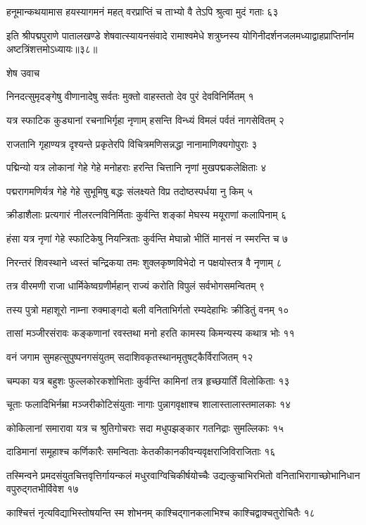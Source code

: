 हनूमान्कथयामास हयस्यागमनं महत्
वरप्राप्तिं च ताभ्यो वै तेऽपि श्रुत्वा मुदं गताः ६३

इति श्रीपद्मपुराणे पातालखण्डे शेषवात्स्यायनसंवादे रामाश्वमेधे शत्रुघ्नस्य योगिनीदर्शनजलमध्याद्वाहप्राप्तिर्नाम अष्टत्रिंशत्तमोऽध्यायः॥३८॥


शेष उवाच

निनदत्सुमृदङ्गेषु वीणानादेषु सर्वतः
मुक्तो वाहस्ततो देव पुरं देवविनिर्मितम् १

यत्र स्फाटिक कुड्यानां रचनाभिर्गृहा नृणाम्
हसन्ति विन्ध्यं विमलं पर्वतं नागसेवितम् २

राजतानि गृहाण्यत्र दृश्यन्ते प्रकृतेरपि
विचित्रमणिसन्नद्धा नानामाणिक्यगोपुराः ३

पद्मिन्यो यत्र लोकानां गेहे गेहे मनोहराः
हरन्ति चित्तानि नृणां मुखपद्मकलेक्षिताः ४

पद्मरागमणिर्यत्र गेहे गेहे सुभूमिषु
बद्धः संलक्ष्यते विप्र तदोष्ठस्पर्धया नु किम् ५

क्रीडाशैलाः प्रत्यगारं नीलरत्नविनिर्मिताः
कुर्वन्ति शङ्कां मेघस्य मयूराणां कलापिनाम् ६

हंसा यत्र नृणां गेहे स्फाटिकेषु नियन्त्रिताः
कुर्वन्ति मेघान्नो भीतिं मानसं न स्मरन्ति च ७

निरन्तरं शिवस्थाने ध्वस्तं चन्द्रिकया तमः
शुक्लकृष्णविभेदो न पक्षयोस्तत्र वै नृणाम् ८

तत्र वीरमणी राजा धार्मिकेष्वग्रणीर्महान्
राज्यं करोति विपुलं सर्वभोगसमन्वितम् ९

तस्य पुत्रो महाशूरो नाम्ना रुक्माङ्गदो बली
वनिताभिर्गतो रम्यदेहाभिः क्रीडितुं वनम् १०

तासां मञ्जीरसंरावः कङ्कणानां रवस्तथा
मनो हरति कामस्य किमन्यस्य कथात्र भोः ११

वनं जगाम सुमहत्सुपुष्पनगसंयुतम्
सदाशिवकृतस्थानमृतुषट्कैर्विराजितम् १२

चम्पका यत्र बहुशः फुल्लकोरकशोभिताः
कुर्वन्ति कामिनां तत्र हृच्छयार्तिं विलोकिताः १३

चूताः फलादिभिर्नम्रा मञ्जरीकोटिसंयुताः
नागाः पुन्नागवृक्षाश्च शालास्तालास्तमालकाः १४

कोकिलानां समारावा यत्र च श्रुतिगोचराः
सदा मधुपझङ्कार गतनिद्राः सुमल्लिकाः १५

दाडिमानां समूहाश्च कर्णिकारैः समन्विताः
केतकीकानकीवन्यवृक्षराजिविराजिताः १६

तस्मिन्वने प्रमदसंयुतचित्तवृत्तिर्गायन्कलं मधुरवाग्विचिकीर्षयोच्चैः
उद्यत्कुचाभिरभितो वनिताभिरागाच्छोभानिधान वपुरुद्गतभीर्विवेश १७

काश्चित्तं नृत्यविद्याभिस्तोषयन्ति स्म शोभनम्
काश्चिद्गानकलाभिश्च काश्चिद्वाक्चतुरोचितैः १८

